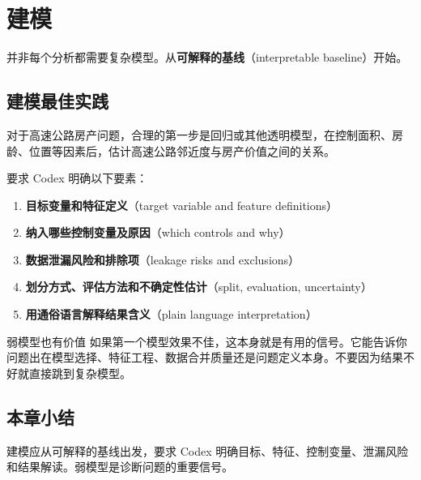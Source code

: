 \section{建模}

并非每个分析都需要复杂模型。从\textbf{可解释的基线}（interpretable baseline）开始。

\subsection{建模最佳实践}

对于高速公路房产问题，合理的第一步是回归或其他透明模型，在控制面积、房龄、位置等因素后，估计高速公路邻近度与房产价值之间的关系。

要求 Codex 明确以下要素：

\begin{enumerate}[nosep]
    \item \textbf{目标变量和特征定义}（target variable and feature definitions）
    \item \textbf{纳入哪些控制变量及原因}（which controls and why）
    \item \textbf{数据泄漏风险和排除项}（leakage risks and exclusions）
    \item \textbf{划分方式、评估方法和不确定性估计}（split, evaluation, uncertainty）
    \item \textbf{用通俗语言解释结果含义}（plain language interpretation）
\end{enumerate}

\begin{warningbox}{弱模型也有价值}
如果第一个模型效果不佳，这本身就是有用的信号。它能告诉你问题出在模型选择、特征工程、数据合并质量还是问题定义本身。不要因为结果不好就直接跳到复杂模型。
\end{warningbox}

\subsection{本章小结}
建模应从可解释的基线出发，要求 Codex 明确目标、特征、控制变量、泄漏风险和结果解读。弱模型是诊断问题的重要信号。

